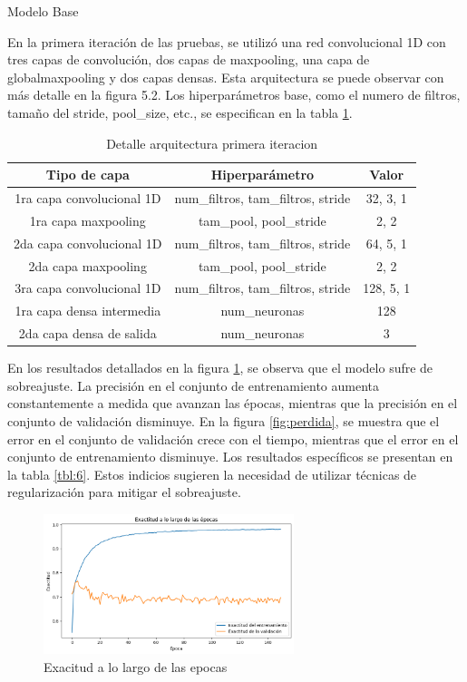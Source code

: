 Modelo Base

En la primera iteración de las pruebas, se utilizó una red convolucional 1D con tres capas de convolución, dos capas de maxpooling, una capa de globalmaxpooling y dos capas densas. Esta arquitectura se puede observar con más detalle en la figura 5.2. Los hiperparámetros base, como el numero de filtros, tamaño del stride, pool\_size, etc., se especifican en la tabla \ref{tbl:5}.


\begin{table}[!ht]
	\centering
	\begin{tabular}{|c|c|c|}
		\hline
		\textbf{Tipo de capa } & \textbf{Hiperparámetro } & \textbf{Valor} \\ \hline
		1ra capa convolucional 1D & num\_filtros, tam\_filtros, stride & 32, 3, 1 \\ \hline
		1ra capa maxpooling & tam\_pool, pool\_stride & 2, 2 \\ \hline
		2da capa convolucional 1D & num\_filtros, tam\_filtros, stride & 64, 5, 1 \\ \hline
		2da capa maxpooling & tam\_pool, pool\_stride & 2, 2 \\ \hline
		3ra capa convolucional 1D & num\_filtros, tam\_filtros, stride & 128, 5, 1 \\ \hline
		1ra capa densa intermedia & num\_neuronas & 128 \\ \hline
		2da capa densa de salida & num\_neuronas & 3 \\ \hline
	\end{tabular}
	\caption{Detalle arquitectura primera iteracion}
	\label{tbl:5}
\end{table}
  
En los resultados detallados en la figura \ref{fig:exactitud}, se observa que el modelo sufre de sobreajuste. La precisión en el conjunto de entrenamiento aumenta constantemente a medida que avanzan las épocas, mientras que la precisión en el conjunto de validación disminuye. En la figura \ref{fig:perdida}, se muestra que el error en el conjunto de validación crece con el tiempo, mientras que el error en el conjunto de entrenamiento disminuye. Los resultados específicos se presentan en la tabla \ref{tbl:6}. Estos indicios sugieren la necesidad de utilizar técnicas de regularización para mitigar el sobreajuste.

\begin{figure}
	\includegraphics[width=0.65\textwidth]{capitulo5/figuras/exactitud.png}
	\caption{Exacitud a lo largo de las epocas}
	\label{fig:exactitud}
\end{figure}


